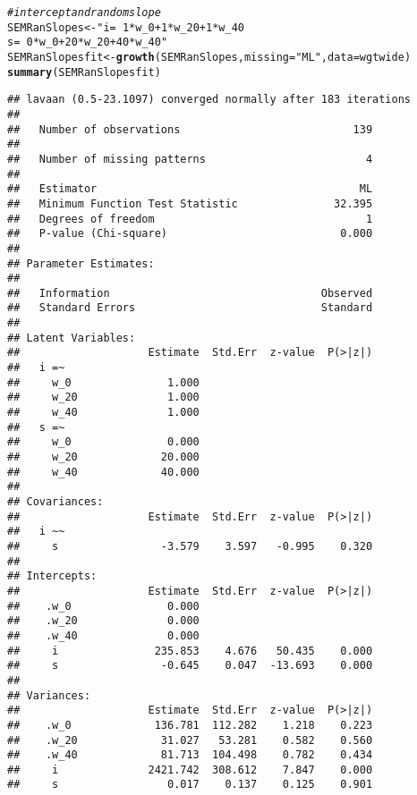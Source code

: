 \documentclass{article}\usepackage[]{graphicx}\usepackage[]{color}
\makeatletter
\newcommand{\hlstr}[1]{\textcolor[rgb]{0.192,0.494,0.8}{#1}}%
\newcommand{\hlcom}[1]{\textcolor[rgb]{0.678,0.584,0.686}{\textit{#1}}}%
\newcommand{\hlstd}[1]{\textcolor[rgb]{0.345,0.345,0.345}{#1}}%
\newcommand{\hlkwb}[1]{\textcolor[rgb]{0.69,0.353,0.396}{#1}}%
\newcommand{\hlkwc}[1]{\textcolor[rgb]{0.333,0.667,0.333}{#1}}%
\newcommand{\hlkwd}[1]{\textcolor[rgb]{0.737,0.353,0.396}{\textbf{#1}}}%
\newenvironment{kframe}{%
 \def\at@end@of@kframe{}%
 \ifinner\ifhmode%
  \def\at@end@of@kframe{\end{minipage}}%
  \begin{minipage}{\columnwidth}%
 \fi\fi%
 \def\FrameCommand##1{\hskip\@totalleftmargin \hskip-\fboxsep
 \colorbox{shadecolor}{##1}\hskip-\fboxsep
     \hskip-\linewidth \hskip-\@totalleftmargin \hskip\columnwidth}%
 \MakeFramed {\advance\hsize-\width
   \@totalleftmargin\z@ \linewidth\hsize
   \@setminipage}}%
 {\par\unskip\endMakeFramed%
 \at@end@of@kframe}
\newenvironment{knitrout}{}{} %
\makeatother
\begin{document}
\begin{knitrout}
\begin{kframe}
\begin{alltt}
\hlcom{# intercept and random slope}
\hlstd{SEMRanSlopes} \hlkwb{<-} \hlstr{" i =~ 1*w_0 + 1*w_20 + 1*w_40
                  s =~ 0*w_0 + 20*w_20 + 40*w_40"}
\hlstd{SEMRanSlopesfit} \hlkwb{<-} \hlkwd{growth}\hlstd{(SEMRanSlopes,} \hlkwc{missing} \hlstd{=} \hlstr{"ML"}\hlstd{,} \hlkwc{data} \hlstd{= wgtwide)}
\hlkwd{summary}\hlstd{(SEMRanSlopesfit)}
\end{alltt}
\begin{verbatim}
## lavaan (0.5-23.1097) converged normally after 183 iterations
## 
##   Number of observations                           139
## 
##   Number of missing patterns                         4
## 
##   Estimator                                         ML
##   Minimum Function Test Statistic               32.395
##   Degrees of freedom                                 1
##   P-value (Chi-square)                           0.000
## 
## Parameter Estimates:
## 
##   Information                                 Observed
##   Standard Errors                             Standard
## 
## Latent Variables:
##                    Estimate  Std.Err  z-value  P(>|z|)
##   i =~                                                
##     w_0               1.000                           
##     w_20              1.000                           
##     w_40              1.000                           
##   s =~                                                
##     w_0               0.000                           
##     w_20             20.000                           
##     w_40             40.000                           
## 
## Covariances:
##                    Estimate  Std.Err  z-value  P(>|z|)
##   i ~~                                                
##     s                -3.579    3.597   -0.995    0.320
## 
## Intercepts:
##                    Estimate  Std.Err  z-value  P(>|z|)
##    .w_0               0.000                           
##    .w_20              0.000                           
##    .w_40              0.000                           
##     i               235.853    4.676   50.435    0.000
##     s                -0.645    0.047  -13.693    0.000
## 
## Variances:
##                    Estimate  Std.Err  z-value  P(>|z|)
##    .w_0             136.781  112.282    1.218    0.223
##    .w_20             31.027   53.281    0.582    0.560
##    .w_40             81.713  104.498    0.782    0.434
##     i              2421.742  308.612    7.847    0.000
##     s                 0.017    0.137    0.125    0.901
\end{verbatim}
\begin{alltt}

\end{alltt}
\end{kframe}
\end{knitrout}
\end{document}
